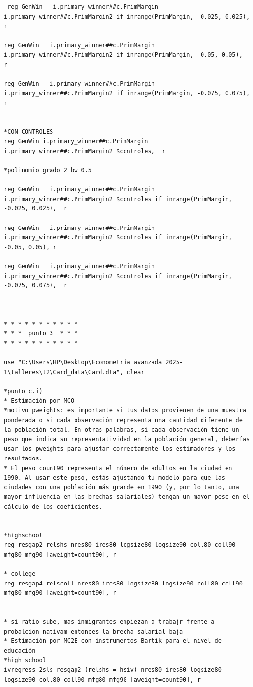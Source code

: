 \documentclass[a4paper, answers, addpoints, 11pt]{exam}
\begin{document}
\begin{verbatim}
 reg GenWin   i.primary_winner##c.PrimMargin i.primary_winner##c.PrimMargin2 if inrange(PrimMargin, -0.025, 0.025),   r

reg GenWin   i.primary_winner##c.PrimMargin i.primary_winner##c.PrimMargin2 if inrange(PrimMargin, -0.05, 0.05),  r

reg GenWin   i.primary_winner##c.PrimMargin i.primary_winner##c.PrimMargin2 if inrange(PrimMargin, -0.075, 0.075),  r
 

*CON CONTROLES
reg GenWin i.primary_winner##c.PrimMargin i.primary_winner##c.PrimMargin2 $controles,  r

*polinomio grado 2 bw 0.5

reg GenWin   i.primary_winner##c.PrimMargin i.primary_winner##c.PrimMargin2 $controles if inrange(PrimMargin, -0.025, 0.025),  r

reg GenWin   i.primary_winner##c.PrimMargin i.primary_winner##c.PrimMargin2 $controles if inrange(PrimMargin, -0.05, 0.05), r

reg GenWin   i.primary_winner##c.PrimMargin i.primary_winner##c.PrimMargin2 $controles if inrange(PrimMargin, -0.075, 0.075),  r



* * * * * * * * * * * 
* * *  punto 3  * * * 
* * * * * * * * * * * 

use "C:\Users\HP\Desktop\Econometría avanzada 2025-1\talleres\t2\Card_data\Card.dta", clear

*punto c.i) 
* Estimación por MCO
*motivo pweights: es importante si tus datos provienen de una muestra ponderada o si cada observación representa una cantidad diferente de la población total. En otras palabras, si cada observación tiene un peso que indica su representatividad en la población general, deberías usar los pweights para ajustar correctamente los estimadores y los resultados.
* El peso count90 representa el número de adultos en la ciudad en 1990. Al usar este peso, estás ajustando tu modelo para que las ciudades con una población más grande en 1990 (y, por lo tanto, una mayor influencia en las brechas salariales) tengan un mayor peso en el cálculo de los coeficientes.


*highschool
reg resgap2 relshs nres80 ires80 logsize80 logsize90 coll80 coll90 mfg80 mfg90 [aweight=count90], r

* college
reg resgap4 relscoll nres80 ires80 logsize80 logsize90 coll80 coll90 mfg80 mfg90 [aweight=count90], r


* si ratio sube, mas inmigrantes empiezan a trabajr frente a probalcion nativam entonces la brecha salarial baja
* Estimación por MC2E con instrumentos Bartik para el nivel de educación
*high school
ivregress 2sls resgap2 (relshs = hsiv) nres80 ires80 logsize80 logsize90 coll80 coll90 mfg80 mfg90 [aweight=count90], r
	

\end{verbatim}
\end{document}
